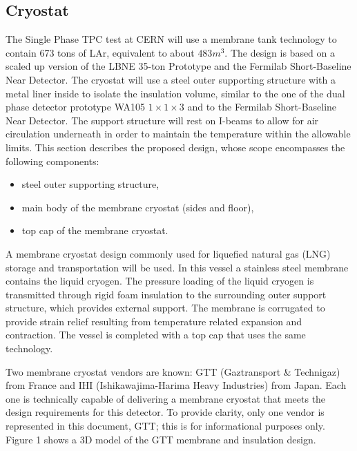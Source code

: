 
\subsection{Cryostat}

The Single Phase TPC test at CERN will use a membrane tank technology to contain  673 tons of LAr, equivalent to about $483 m^3$. The design is based on a scaled up version of the LBNE 35-ton Prototype\cite{montanari_35ton} 
and the Fermilab Short-Baseline Near Detector\cite{acciarri_sbn_proposal}.  
The cryostat will use a steel outer supporting structure with a metal liner inside to isolate the insulation volume, similar to the one of the dual phase detector prototype WA105 $1\times1\times3$ and to the Fermilab Short-Baseline Near Detector. The support structure will rest on I-beams to allow for air circulation underneath in order to maintain the temperature within the allowable limits.
This section describes the proposed design, whose scope encompasses the following components:

\begin{itemize}
\item steel outer supporting structure,
\item main body of the membrane cryostat (sides and floor), 
\item top cap of the membrane cryostat.
\end{itemize}

A membrane cryostat design commonly used for liquefied natural gas (LNG) storage and transportation will be used. In this vessel a stainless steel membrane contains the liquid cryogen. The pressure loading of the liquid cryogen is transmitted through rigid foam insulation to the surrounding outer support structure, which provides external support. The membrane is corrugated to provide strain relief resulting from temperature related expansion and contraction. The vessel is completed with a top cap that uses the same technology.

Two membrane cryostat vendors are known: GTT (Gaztransport \& Technigaz) from France and IHI (Ishikawajima-Harima Heavy Industries) from Japan. Each one is technically capable of delivering a membrane cryostat that meets the design requirements for this detector. To provide clarity, only one vendor is represented in this document, GTT; this is for informational purposes only. Figure 1 shows a 3D model of the GTT membrane and insulation design.


